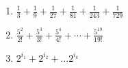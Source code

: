 \documentclass{article}
\begin{document}
\begin{itemize}
\begin{enumerate}
                        \begin{enumerate}
                            \item $\displaystyle \frac{1}{3}+\frac{1}{9}+\frac{1}{27}+\frac{1}{81} + \frac{1}{243}+ \frac{1}{729}$
                            \item $\displaystyle \frac{5^2}{2!}+\frac{5^3}{3!}+\frac{5^4}{4!} + \cdots + \frac{5^{19}}{19!}$
                            \item $2^{i_1} + 2^{i_2} + \ldots 2^{i_k}$
                        \end{enumerate}
                \end{enumerate}
        \end{itemize}










  

 

\end{document}
